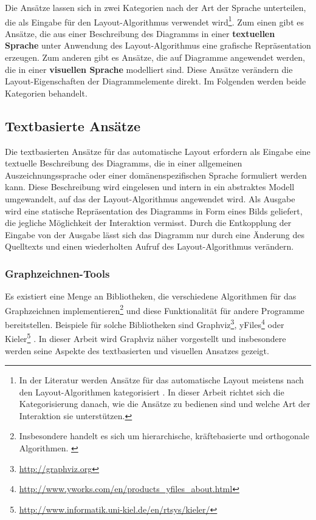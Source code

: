 Die Ansätze lassen sich in zwei Kategorien nach der Art der Sprache unterteilen, die als Eingabe für den Layout-Algorithmus verwendet wird\footnote{In der Literatur werden Ansätze für das automatische Layout meistens nach den Layout-Algorithmen kategorisiert \cite[S.39ff]{Fuhrmann11On-the-Pragmatics} \cite[S.32ff]{Eichelberger05Aesthetics}. In dieser Arbeit richtet sich die Kategorisierung danach, wie die Ansätze zu bedienen sind und welche Art der Interaktion sie unterstützen.}. Zum einen gibt es Ansätze, die aus einer Beschreibung des Diagramms in einer \textbf{textuellen Sprache} unter Anwendung des Layout-Algorithmus eine grafische Repräsentation erzeugen. Zum anderen gibt es Ansätze, die auf Diagramme angewendet werden, die in einer \textbf{visuellen Sprache} modelliert sind. Diese Ansätze verändern die Layout-Eigenschaften der Diagrammelemente direkt. Im Folgenden werden beide Kategorien behandelt.


\subsection{Textbasierte Ansätze}
\label{subsec:text-based-approaches}

Die textbasierten Ansätze für das automatische Layout erfordern als Eingabe eine textuelle Beschreibung des Diagramms, die in einer allgemeinen Auszeichnungssprache oder einer domänenspezifischen Sprache formuliert werden kann. Diese Beschreibung wird eingelesen und intern in ein abstraktes Modell umgewandelt, auf das der Layout-Algorithmus angewendet wird. Als Ausgabe wird eine statische Repräsentation des Diagramms in Form eines Bilds geliefert, die jegliche Möglichkeit der Interaktion vermisst. Durch die Entkopplung der Eingabe von der Ausgabe lässt sich das Diagramm nur durch eine Änderung des Quelltexts und einen wiederholten Aufruf des Layout-Algorithmus verändern.

\subsubsection{Graphzeichnen-Tools}
\label{subsubsec:graph-drawing-tools}

Es existiert eine Menge an Bibliotheken, die verschiedene Algorithmen für das Graphzeichnen implementieren\footnote{Insbesondere handelt es sich um hierarchische, kräftebasierte und orthogonale Algorithmen. \cite{Maier12A-Pattern-based}} und diese Funktionalität für andere Programme bereitstellen. Beispiele für solche Bibliotheken sind Graphviz\footnote{\url{http://graphviz.org}}, yFiles\footnote{\url{http://www.yworks.com/en/products_yfiles_about.html}} oder Kieler\footnote{\url{http://www.informatik.uni-kiel.de/en/rtsys/kieler/}} \cite{Maier12A-Pattern-based}. In dieser Arbeit wird Graphviz näher vorgestellt und insbesondere werden seine Aspekte des textbasierten und visuellen Ansatzes gezeigt.

